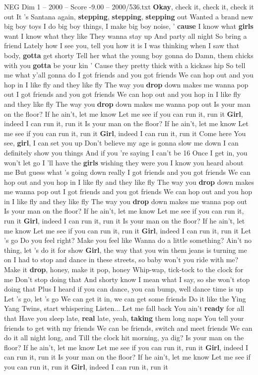 \begin{textsample}{NEG Dim 1 – 2000 – Score -9.00 – 2000/536.txt}  \label{ex:f1_neg_011}
\textbf{Okay}, check it, check it, check it out It 's Santana again, \textbf{stepping}, \textbf{stepping}, \textbf{stepping} out Wanted a brand new big boy toys I do big boy things, I make big boy noise, ' \textbf{cause} I know what \textbf{girls} want I know what they like They wanna stay up And party all night So bring a friend Lately how I see you, tell you how it is I was thinking when I saw that body, \textbf{gotta} get shorty Tell her what the young boy gonna do Damn, them chicks with you \textbf{gotta} be your kin ' Cause they pretty thick with a kickass hip So tell me what y'all gonna do I got friends and you got friends We can hop out and you hop in I like fly and they like fly The way you \textbf{drop} down makes me wanna pop out I got friends and you got friends We can hop out and you hop in I like fly and they like fly The way you \textbf{drop} down makes me wanna pop out Is your man on the floor?
If he ain't, let me know Let me see if you can run it, run it \textbf{Girl}, indeed I can run it, run it Is your man on the floor?
If he ain't, let me know Let me see if you can run it, run it \textbf{Girl}, indeed I can run it, run it Come here You see, \textbf{girl}, I can set you up Don't believe my age is gonna slow me down I can definitely show you things And if you 're saying I can't be 16 Once I get in, you won't let go I 'll have the \textbf{girls} wishing they were you I know you heard about me But guess what 's going down really I got friends and you got friends We can hop out and you hop in I like fly and they like fly The way you \textbf{drop} down makes me wanna pop out I got friends and you got friends We can hop out and you hop in I like fly and they like fly The way you \textbf{drop} down makes me wanna pop out Is your man on the floor?
If he ain't, let me know Let me see if you can run it, run it \textbf{Girl}, indeed I can run it, run it Is your man on the floor?
If he ain't, let me know Let me see if you can run it, run it \textbf{Girl}, indeed I can run it, run it Let 's go Do you feel right?
Make you feel like Wanna do a little something?
Ain't no thing, let 's do it for show \textbf{Girl}, the way that you win them jeans is turning me on I had to stop and dance in these streets, so baby won't you ride with me?
Make it \textbf{drop}, honey, make it pop, honey Whip-wap, tick-tock to the clock for me Don't stop doing that And shorty know I mean what I say, so she won't stop doing that Plus I heard if you can dance, you can bump, well dance time is up Let 's go, let 's go We can get it in, we can get some friends Do it like the Ying Yang Twins, start whispering Listen...
Let me fall back You ain't \textbf{ready} for all that Have you sleep late, \textbf{real} late, yeah, \textbf{taking} them long naps You tell your friends to get with my friends We can be friends, switch and meet friends We can do it all night long, and Till the clock hit morning, ya dig?
Is your man on the floor?
If he ain't, let me know Let me see if you can run it, run it \textbf{Girl}, indeed I can run it, run it Is your man on the floor?
If he ain't, let me know Let me see if you can run it, run it \textbf{Girl}, indeed I can run it, run it

\end{textsample}
